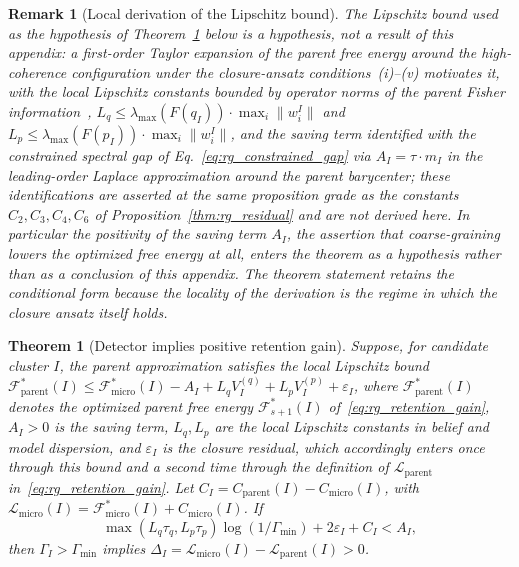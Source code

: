 \documentclass[11pt]{article}
\newtheorem{theorem}{Theorem}
\newtheorem{remark}{Remark}
\begin{document}
\begin{remark}[Local derivation of the Lipschitz bound]
The Lipschitz bound used as the hypothesis of Theorem~\ref{thm:rg_detector_retention} below is a hypothesis, not a result of this appendix: a first-order Taylor expansion of the parent free energy around the high-coherence configuration under the closure-ansatz conditions~(i)--(v) motivates it, with the local Lipschitz constants bounded by operator norms of the parent Fisher information~\cite{Amari2016}, $L_q \le \lambda_{\max}(F(q_I)) \cdot \max_i\|w_i^I\|$ and $L_p \le \lambda_{\max}(F(p_I)) \cdot \max_i\|w_i^I\|$, and the saving term identified with the constrained spectral gap of Eq.~\eqref{eq:rg_constrained_gap} via $A_I = \tau \cdot m_I$ in the leading-order Laplace approximation around the parent barycenter; these identifications are asserted at the same proposition grade as the constants $C_2, C_3, C_4, C_6$ of Proposition~\ref{thm:rg_residual} and are not derived here. In particular the positivity of the saving term $A_I$, the assertion that coarse-graining lowers the optimized free energy at all, enters the theorem as a hypothesis rather than as a conclusion of this appendix. The theorem statement retains the conditional form because the locality of the derivation is the regime in which the closure ansatz itself holds.
\end{remark}

\begin{theorem}[Detector implies positive retention gain]
\label{thm:rg_detector_retention}
Suppose, for candidate cluster $I$, the parent approximation satisfies the local Lipschitz bound $\mathcal{F}_{\mathrm{parent}}^*(I) \le \mathcal{F}_{\mathrm{micro}}^*(I) - A_I + L_q V_I^{(q)} + L_p V_I^{(p)} + \varepsilon_I$, where $\mathcal{F}_{\mathrm{parent}}^*(I)$ denotes the optimized parent free energy $\mathcal{F}_{s+1}^*(I)$ of~\eqref{eq:rg_retention_gain}, $A_I > 0$ is the saving term, $L_q, L_p$ are the local Lipschitz constants in belief and model dispersion, and $\varepsilon_I$ is the closure residual, which accordingly enters once through this bound and a second time through the definition of $\mathcal{L}_{\mathrm{parent}}$ in~\eqref{eq:rg_retention_gain}. Let $C_I = C_{\mathrm{parent}}(I) - C_{\mathrm{micro}}(I)$, with $\mathcal{L}_{\mathrm{micro}}(I) = \mathcal{F}_{\mathrm{micro}}^*(I) + C_{\mathrm{micro}}(I)$. If
\begin{equation}
\max(L_q\tau_q, L_p\tau_p)\log(1/\Gamma_{\min}) + 2\varepsilon_I + C_I < A_I,
\label{eq:rg_app_detector_retention}
\end{equation}
then $\Gamma_I > \Gamma_{\min}$ implies $\Delta_I = \mathcal{L}_{\mathrm{micro}}(I) - \mathcal{L}_{\mathrm{parent}}(I) > 0$.
\end{theorem}
\end{document}
